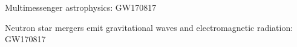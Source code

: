 \documentclass[usenames,dvipsnames,t]{beamer}
\begin{document}
\begin{frame}{Multimessenger astrophysics: GW170817}

  \def\x{2mm}
  
  Neutron star mergers emit gravitational waves and electromagnetic radiation: GW170817~\cite{LIGOScientific:2017vwq, LIGOScientific:2017zic}

  
  

\end{frame}
\end{document}

